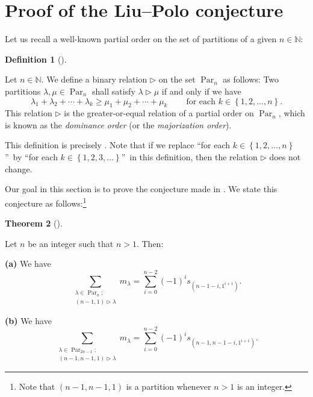 \documentclass[numbers=enddot,12pt,final,onecolumn,notitlepage]{scrartcl}%
\theoremstyle{definition}
\newtheorem{theo}{Theorem}[section]
\newenvironment{theorem}[1][]
{\begin{theo}[#1]\begin{leftbar}}
{\end{leftbar}\end{theo}}
\newtheorem{defi}[theo]{Definition}
\newenvironment{definition}[1][]
{\begin{defi}[#1]\begin{leftbar}}
{\end{leftbar}\end{defi}}
\let\sumnonlimits\sum
\renewcommand{\sum}{\sumnonlimits\limits}
\begin{document}
\section{\label{sect.liu}Proof of the Liu--Polo conjecture}

Let us recall a well-known partial order on the set of partitions of a given
$n\in\mathbb{N}$:

\begin{definition}
\label{def.dominance}Let $n\in\mathbb{N}$. We define a binary relation
$\triangleright$ on the set $\operatorname*{Par}\nolimits_{n}$ as follows: Two
partitions $\lambda,\mu\in\operatorname*{Par}\nolimits_{n}$ shall satisfy
$\lambda\triangleright\mu$ if and only if we have%
\[
\lambda_{1}+\lambda_{2}+\cdots+\lambda_{k}\geq\mu_{1}+\mu_{2}+\cdots+\mu
_{k}\ \ \ \ \ \ \ \ \ \ \text{for each }k\in\left\{  1,2,\ldots,n\right\}  .
\]
This relation $\triangleright$ is the greater-or-equal relation of a partial
order on $\operatorname*{Par}\nolimits_{n}$, which is known as the
\emph{dominance order} (or the \emph{majorization order}).
\end{definition}

This definition is precisely \cite[Definition 2.2.7]{GriRei}. Note that if we
replace \textquotedblleft for each $k\in\left\{  1,2,\ldots,n\right\}
$\textquotedblright\ by \textquotedblleft for each $k\in\left\{
1,2,3,\ldots\right\}  $\textquotedblright\ in this definition, then the
relation $\triangleright$ does not change.

Our goal in this section is to prove the conjecture made in \cite[Remark
1.4.5]{LiuPol19}. We state this conjecture as follows:\footnote{Note that
$\left(  n-1,n-1,1\right)  $ is a partition whenever $n>1$ is an integer.}

\begin{theorem}
\label{thm.claim}Let $n$ be an integer such that $n>1$. Then:

\textbf{(a)} We have%
\[
\sum_{\substack{\lambda\in\operatorname*{Par}\nolimits_{n};\\\left(
n-1,1\right)  \triangleright\lambda}}m_{\lambda}=\sum_{i=0}^{n-2}\left(
-1\right)  ^{i}s_{\left(  n-1-i,1^{i+1}\right)  }.
\]


\textbf{(b)} We have%
\[
\sum_{\substack{\lambda\in\operatorname*{Par}\nolimits_{2n-1};\\\left(
n-1,n-1,1\right)  \triangleright\lambda}}m_{\lambda}=\sum_{i=0}^{n-2}\left(
-1\right)  ^{i}s_{\left(  n-1,n-1-i,1^{i+1}\right)  }.
\]

\end{theorem}
\end{document}

